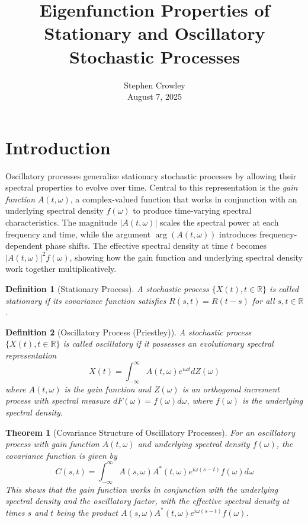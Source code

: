 \documentclass{article}
\newcommand{\tmaffiliation}[1]{\\ #1}
\newcommand{\tmem}[1]{{\em #1\/}}
\newtheorem{definition}{Definition}
\newtheorem{theorem}{Theorem}
\begin{document}
\title{Eigenfunction Properties of Stationary and Oscillatory Stochastic
Processes}

\author{
  Stephen Crowley
  \tmaffiliation{August 7, 2025}
}

\date{}

\maketitle

\section*{Introduction}

Oscillatory processes generalize stationary stochastic processes by allowing
their spectral properties to evolve over time. Central to this representation
is the {\tmem{gain function}} $A (t, \omega)$, a complex-valued function that
works in conjunction with an underlying spectral density $f (\omega)$ to
produce time-varying spectral characteristics. The magnitude $|A (t, \omega)
|$ scales the spectral power at each frequency and time, while the argument
$\arg (A (t, \omega))$ introduces frequency-dependent phase shifts. The
effective spectral density at time $t$ becomes $|A (t, \omega) |^2 f
(\omega)$, showing how the gain function and underlying spectral density work
together multiplicatively.

\begin{definition}
  [Stationary Process] A stochastic process $\{X (t), t \in \mathbb{R}\}$ is
  called stationary if its covariance function satisfies $R (s, t) = R (t -
  s)$ for all $s, t \in \mathbb{R}$.
\end{definition}

\begin{definition}
  [Oscillatory Process (Priestley)] A stochastic process $\{X (t), t \in
  \mathbb{R}\}$ is called oscillatory if it possesses an evolutionary spectral
  representation
  \begin{equation}
    X (t) = \int_{- \infty}^{\infty} A (t, \omega) e^{i \omega t} dZ (\omega)
  \end{equation}
  where $A (t, \omega)$ is the gain function and $Z (\omega)$ is an orthogonal
  increment process with spectral measure $dF (\omega) = f (\omega) d \omega$,
  where $f (\omega)$ is the underlying spectral density.
\end{definition}

\begin{theorem}
  [Covariance Structure of Oscillatory Processes] For an oscillatory process
  with gain function $A (t, \omega)$ and underlying spectral density $f
  (\omega)$, the covariance function is given by
  \begin{equation}
    C (s, t) = \int_{- \infty}^{\infty} A (s, \omega) A^{\ast} (t, \omega) e^{i \omega (s - t)} f
    (\omega) d \omega
  \end{equation}
  This shows that the gain function works in conjunction with the underlying
  spectral density and the oscillatory factor, with the effective spectral density at times $s$ and $t$
  being the product $A (s, \omega) A^{\ast} (t, \omega) e^{i \omega (s - t)} f (\omega)$.
\end{theorem}
\end{document}
